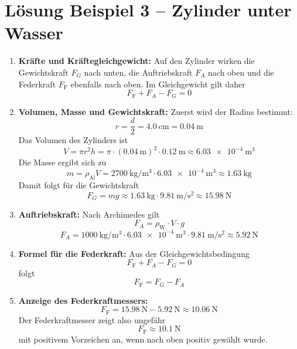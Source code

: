 \documentclass[11pt, a4paper]{article}
\begin{document}
\newpage

\section*{Lösung Beispiel 3 -- Zylinder unter Wasser}
\begin{enumerate}
    \item \textbf{Kräfte und Kräftegleichgewicht:}
    Auf den Zylinder wirken die Gewichtskraft $F_G$ nach unten, die Auftriebskraft $F_A$ nach oben und die Federkraft $F_{\text{F}}$ ebenfalls nach oben. Im Gleichgewicht gilt daher
    \[
        F_{\text{F}} + F_A - F_G = 0
    \]

    \item \textbf{Volumen, Masse und Gewichtskraft:}
    Zuerst wird der Radius bestimmt:
    \[
        r = \frac{d}{2} = \SI{4.0}{\centi\metre} = \SI{0.04}{\metre}
    \]
    Das Volumen des Zylinders ist
    \[
        V = \pi r^2 h = \pi \cdot (\SI{0.04}{\metre})^2 \cdot \SI{0.12}{\metre} \approx \SI{6.03e-4}{\metre\cubed}
    \]
    Die Masse ergibt sich zu
    \[
        m = \rho_{\text{Al}} V = \SI{2700}{\kilogram\per\metre\cubed} \cdot \SI{6.03e-4}{\metre\cubed} \approx \SI{1.63}{\kilogram}
    \]
    Damit folgt f\"ur die Gewichtskraft
    \[
        F_G = mg \approx \SI{1.63}{\kilogram} \cdot \SI{9.81}{\metre\per\second\squared} \approx \SI{15.98}{\newton}
    \]

    \item \textbf{Auftriebskraft:}
    Nach Archimedes gilt
    \[
        F_A = \rho_{\text{W}}\cdot V \cdot g
    \]
    \[
        F_A = \SI{1000}{\kilogram\per\metre\cubed} \cdot \SI{6.03e-4}{\metre\cubed} \cdot \SI{9.81}{\metre\per\second\squared} \approx \SI{5.92}{\newton}
    \]

    \item \textbf{Formel für die Federkraft:}
    Aus der Gleichgewichtsbedingung
    \[
        F_{\text{F}} + F_A - F_G = 0
    \]
    folgt
    \[
        F_{\text{F}} = F_G - F_A
    \]

    \item \textbf{Anzeige des Federkraftmessers:}
    \[
        F_{\text{F}} = \SI{15.98}{\newton} - \SI{5.92}{\newton} \approx \SI{10.06}{\newton}
    \]
    Der Federkraftmesser zeigt also ungef\"ahr
    \[
        F_{\text{F}} \approx \SI{10.1}{\newton}
    \]
    mit positivem Vorzeichen an, wenn nach oben positiv gewählt wurde.
\end{enumerate}

\newpage
\end{document}
